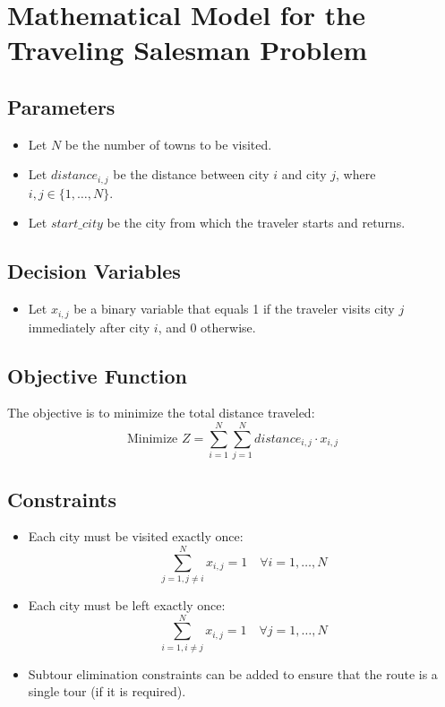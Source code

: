 \documentclass{article}
\begin{document}
\section*{Mathematical Model for the Traveling Salesman Problem}

\subsection*{Parameters}
\begin{itemize}
    \item Let $N$ be the number of towns to be visited.
    \item Let $distance_{i,j}$ be the distance between city $i$ and city $j$, where $i,j \in \{1, \ldots, N\}$.
    \item Let $start\_city$ be the city from which the traveler starts and returns.
\end{itemize}

\subsection*{Decision Variables}
\begin{itemize}
    \item Let $x_{i,j}$ be a binary variable that equals 1 if the traveler visits city $j$ immediately after city $i$, and 0 otherwise.
\end{itemize}

\subsection*{Objective Function}
The objective is to minimize the total distance traveled:
\[
\text{Minimize } Z = \sum_{i=1}^{N} \sum_{j=1}^{N} distance_{i,j} \cdot x_{i,j}
\]

\subsection*{Constraints}
\begin{itemize}
    \item Each city must be visited exactly once:
    \[
    \sum_{j=1, j \neq i}^{N} x_{i,j} = 1 \quad \forall i = 1, \ldots, N
    \]
    \item Each city must be left exactly once:
    \[
    \sum_{i=1, i \neq j}^{N} x_{i,j} = 1 \quad \forall j = 1, \ldots, N
    \]
    \item Subtour elimination constraints can be added to ensure that the route is a single tour (if it is required).
\end{itemize}
\end{document}
